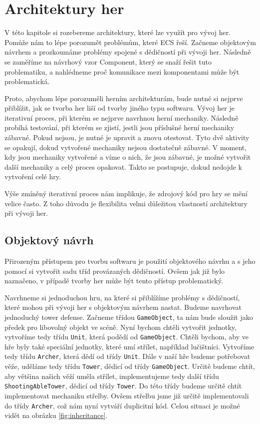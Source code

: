 \chapter{Architektury her}
V této kapitole si rozebereme architektury, které lze využít pro vývoj her. Pomůže nám to lépe porozumět problémům, které ECS řeší. Začneme objektovým návrhem a prozkoumáme problémy spojené s dědičností při vývoji her. Následně se zaměříme na návrhový vzor Component, který se snaží řešit tuto problematiku, a nahlédneme proč komunikace mezi komponentami může být problematická.

Proto, abychom lépe porozuměli herním architekturám, bude nutné si nejprve přiblížit, jak se tvorba her liší od tvorby jiného typu softwaru. Vývoj her je iterativní proces, při kterém se nejprve navrhnou herní mechaniky. Následně probíhá testování, při kterém se zjistí, jestli jsou příslušné herní mechaniky zábavné. Pokud nejsou, je nutné je upravit a znovu otestovat. Tyto dvě aktivity se opakují, dokud vytvořené mechaniky nejsou dostatečně zábavné. V moment, kdy jsou mechaniky vytvořené a víme o nich, že jsou zábavné, je možné vytvořit další mechaniky a celý proces opakovat. Takto se postupuje, dokud nedojde k vytvoření celé hry.

Výše zmíněný iterativní proces nám implikuje, že zdrojový kód pro hry se mění velice často. Z toho důvodu je flexibilita velmi důležitou vlastností architektury při vývoji her.

\section{Objektový návrh}
Přirozeným přístupem pro tvorbu softwaru je použití objektového návrhu a s jeho pomocí si vytvořit sadu tříd provázaných dědičností. Ovšem jak již bylo naznačeno, v případě tvorby her může být tento přístup problematický.


Navrhneme si jednoduchou hru, na které si přiblížíme problémy s dědičností, které mohou při vývoji her s objektovým návrhem nastat. Budeme navrhovat jednoduchý tower defense. Začneme třídou \verb|GameObject|, ta nám bude sloužit jako předek pro libovolný objekt ve scéně. Nyní bychom chtěli vytvořit jednotky, vytvoříme tedy třídu \verb|Unit|, která podědí od \verb|GameObject|. Chtěli bychom, aby ve hře byly také speciální jednotky, které umí střílet, například lučištníci. Vytvoříme tedy třídu \verb|Archer|, která dědí od třídy \verb|Unit|. Dále v naší hře budeme potřebovat věže, uděláme tedy třídu \verb|Tower|, dědicí od třídy \verb|GameObject|. Určitě budeme chtít, aby většina našich věží uměla střílet, implementujeme tedy další třídu \verb|ShootingAbleTower|, dědicí od třídy \verb|Tower|. Do této třídy budeme určitě chtít implementovat mechaniku střelby. Ovšem střelbu jsme již určitě implementovali do třídy \verb|Archer|, což nám nyní vytváří duplicitní kód. Celou situaci je možné vidět na obrázku \ref{fig:inheritance}.

